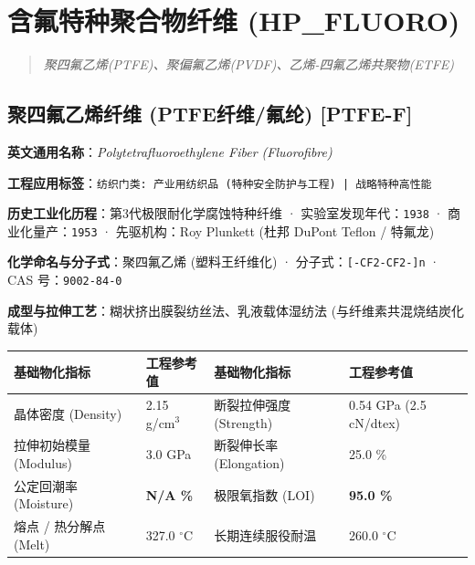 \documentclass[11pt,openright,twoside,UTF8]{ctexbook}
\begin{document}
\chapter{含氟特种聚合物纤维 (HP\_FLUORO)}
\begin{quote}
\small\itshape
聚四氟乙烯(PTFE)、聚偏氟乙烯(PVDF)、乙烯-四氟乙烯共聚物(ETFE)
\end{quote}

\section{聚四氟乙烯纤维 (PTFE纤维/氟纶) [PTFE-F]}
\label{sec:ptfe-f}

\noindent\textbf{英文通用名称}：\textit{Polytetrafluoroethylene Fiber (Fluorofibre)}\par
\noindent\textbf{工程应用标签}：\texttt{纺织门类: 产业用纺织品 (特种安全防护与工程) | 战略特种高性能}\par
\noindent\textbf{历史工业化历程}：第3代极限耐化学腐蚀特种纤维 · 实验室发现年代：\texttt{1938} · 商业化量产：\texttt{1953} · 先驱机构：Roy Plunkett (杜邦 DuPont Teflon / 特氟龙)\par
\noindent\textbf{化学命名与分子式}：聚四氟乙烯 (塑料王纤维化) · 分子式：\texttt{[-CF2-CF2-]n} · CAS 号：\texttt{9002-84-0}\par
\noindent\textbf{成型与拉伸工艺}：糊状挤出膜裂纺丝法、乳液载体湿纺法 (与纤维素共混烧结炭化载体)\par

\vspace{0.15cm}
\begin{center}
\small
\begin{tabularx}{\textwidth}{p{3.8cm}Xp{3.8cm}X}
\toprule
\textbf{基础物化指标} & \textbf{工程参考值} & \textbf{基础物化指标} & \textbf{工程参考值} \\
\midrule
晶体密度 (Density) & 2.15 g/cm$^3$ & 断裂拉伸强度 (Strength) & 0.54 GPa (2.5 cN/dtex) \\
拉伸初始模量 (Modulus) & 3.0 GPa & 断裂伸长率 (Elongation) & 25.0 \% \\
公定回潮率 (Moisture) & \textbf{N/A \%} & 极限氧指数 (LOI) & \textbf{95.0 \%} \\
熔点 / 热分解点 (Melt) & 327.0 $^\circ\mathrm{C}$ & 长期连续服役耐温 & 260.0 $^\circ\mathrm{C}$ \\
\bottomrule
\end{tabularx}
\end{center}
\vspace{0.15cm}
\end{document}
